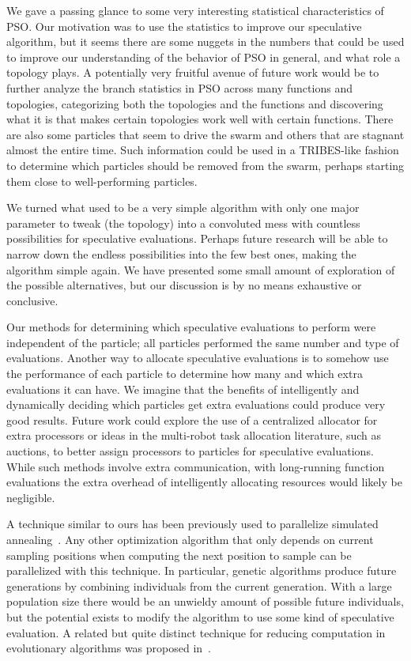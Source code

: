 \documentclass[journal,letterpaper]{IEEEtran}
\begin{document}
We gave a passing glance to some very interesting statistical characteristics
of PSO.  Our motivation was to use the statistics to improve our speculative
algorithm, but it seems there are some nuggets in the numbers that could be
used to improve our understanding of the behavior of PSO in general, and what
role a topology plays.  A potentially very fruitful avenue of future work would
be to further analyze the branch statistics in PSO across many functions and
topologies, categorizing both the topologies and the functions and discovering
what it is that makes certain topologies work well with certain functions.
There are also some particles that seem to drive the swarm and others that are
stagnant almost the entire time.  Such information could be used in a
TRIBES-like fashion~\cite{clerc-2003-tribes} to determine which particles
should be removed from the swarm, perhaps starting them close to
well-performing particles.

We turned what used to be a very simple algorithm with only one major parameter
to tweak (the topology) into a convoluted mess with countless possibilities for
speculative evaluations.  Perhaps future research will be able to narrow down
the endless possibilities into the few best ones, making the algorithm simple
again.  We have presented some small amount of exploration of the possible
alternatives, but our discussion is by no means exhaustive or conclusive.

Our methods for determining which speculative evaluations to perform were
independent of the particle; all particles performed the same number and type
of evaluations.  Another way to allocate speculative evaluations is to somehow
use the performance of each particle to determine how many and which extra
evaluations it can have.  We imagine that the benefits of intelligently and
dynamically deciding which particles get extra evaluations could produce very
good results.  Future work could explore the use of a centralized allocator for
extra processors or ideas in the multi-robot task allocation literature, such
as auctions, to better assign processors to particles for speculative
evaluations.  While such methods involve extra communication, with long-running
function evaluations the extra overhead of intelligently allocating resources
would likely be negligible.

A technique similar to ours has been previously used to parallelize simulated
annealing~\cite{witte-1991-parallel-simulated-annealing-speculative}.  Any
other optimization algorithm that only depends on current sampling positions
when computing the next position to sample can be parallelized with this
technique.  In particular, genetic algorithms produce future generations by
combining individuals from the current generation.  With a large population
size there would be an unwieldy amount of possible future individuals, but the
potential exists to modify the algorithm to use some kind of speculative
evaluation.  A related but quite distinct technique for reducing computation in
evolutionary algorithms was proposed
in~\cite{poli-2006-backward-chaining-evolutionary-algorithms}.
\end{document}
